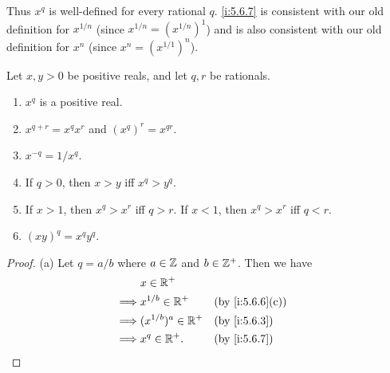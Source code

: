 \begin{note}
  Thus \(x^q\) is well-defined for every rational \(q\).
  \cref{i:5.6.7} is consistent with our old definition for \(x^{1 / n}\) (since \(x^{1 / n} = (x^{1 / n})^1\)) and is also consistent with our old definition for \(x^n\) (since \(x^n = (x^{1 / 1})^n\)).
\end{note}

\begin{lem}\label{i:5.6.9}
  Let \(x, y > 0\) be positive reals, and let \(q, r\) be rationals.
  \begin{enumerate}
    \item \(x^q\) is a positive real.
    \item \(x^{q + r} = x^q x^r\) and \((x^q)^r = x^{qr}\).
    \item \(x^{-q} = 1 / x^q\).
    \item If \(q > 0\), then \(x > y\) iff \(x^q > y^q\).
    \item If \(x > 1\), then \(x^q > x^r\) iff \(q > r\).
          If \(x < 1\), then \(x^q > x^r\) iff \(q < r\).
    \item \((xy)^q = x^q y^q\).
  \end{enumerate}
\end{lem}

\begin{proof}{(a)}
  Let \(q = a / b\) where \(a \in \mathbb{Z}\) and \(b \in \mathbb{Z}^+\).
  Then we have
  \begin{align*}
             & x \in \R^+                                  \\
    \implies & x^{1 / b} \in \R^+     &  & \by{i:5.6.6}[c] \\
    \implies & (x^{1 / b})^a \in \R^+ &  & \by{i:5.6.3}    \\
    \implies & x^q \in \R^+.          &  & \by{i:5.6.7}
  \end{align*}
\end{proof}

